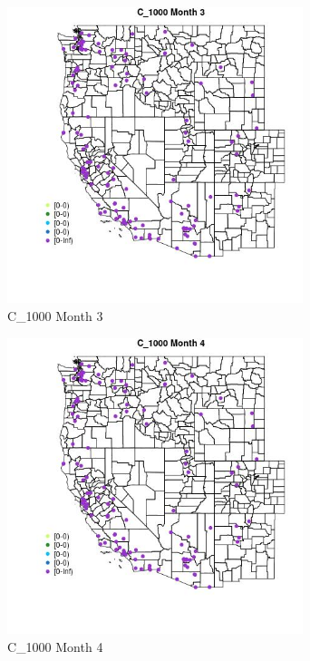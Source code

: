 \begin{figure} 
\centering  
\includegraphics[width=0.77\textwidth]{Code_Outputs/Report_ML_input_PM25_Step4_part_e_de_duplicated_aves_MapObsMo3C_1000.jpg} 
\caption{\label{fig:Report_ML_input_PM25_Step4_part_e_de_duplicated_avesMapObsMo3C_1000}C_1000 Month 3} 
\end{figure} 
 

\begin{figure} 
\centering  
\includegraphics[width=0.77\textwidth]{Code_Outputs/Report_ML_input_PM25_Step4_part_e_de_duplicated_aves_MapObsMo4C_1000.jpg} 
\caption{\label{fig:Report_ML_input_PM25_Step4_part_e_de_duplicated_avesMapObsMo4C_1000}C_1000 Month 4} 
\end{figure} 
 


